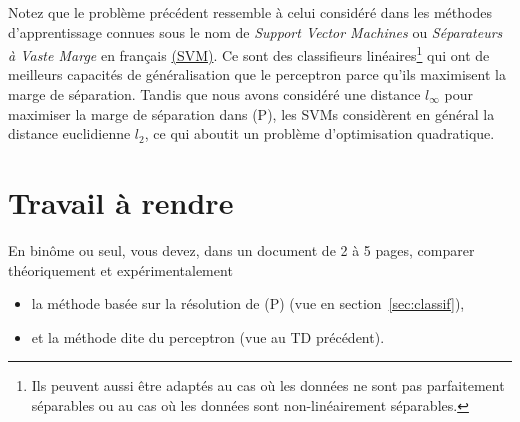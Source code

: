 \documentclass[a4paper,francais]{article}
\theoremstyle{definition}
\newtheorem{exercice}{Exercice}[section]
\begin{document}

Notez que le problème précédent ressemble à celui considéré dans les
méthodes d'apprentissage connues sous le nom de \emph{Support Vector Machines}
ou \emph{Séparateurs à Vaste Marge} en français
\href{https://en.wikipedia.org/wiki/Support-vector_machine}{(SVM)}.
Ce sont des classifieurs linéaires\footnote{Ils peuvent aussi être adaptés
au cas où les données ne sont pas parfaitement séparables ou au cas où les données
sont non-linéairement séparables.} 
qui ont de meilleurs capacités de généralisation que le perceptron 
parce qu'ils maximisent la marge de séparation. Tandis que nous avons
considéré une distance $l_\infty$ pour maximiser la marge de séparation
dans (P), les SVMs considèrent en général la distance euclidienne $l_2$,
ce qui aboutit un problème d'optimisation quadratique. 

\section{Travail à rendre}
\label{sec:travail}

En binôme ou seul, vous devez, dans un document de 2 à 5 pages,
comparer théoriquement et expérimentalement
\begin{itemize}
\item la méthode basée sur la résolution de (P) (vue en section~\ref{sec:classif}), 
\item et la méthode dite du perceptron (vue au TD précédent). 
\end{itemize}
\end{document}
